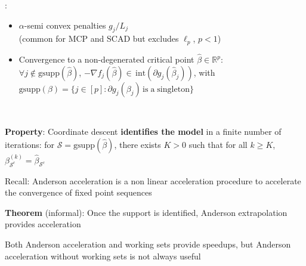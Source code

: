 \documentclass[english,final,t]{beamer}
\newcommand{\bbR}{\mathbb{R}}
\newcommand{\cS}{\mathcal{S}}
\begin{document}
\begin{frame}{}
\begin{columns}[t]
\begin{column}{.3\linewidth}
\begin{block}{\textbf{\color{malgared}{\# 2 Support Identification}}}
		{\color{malgared}{Assumptions}}:
		\begin{itemize}
			\item
			$\alpha$-semi convex penalties $g_j / L_j$
			\\
			(common for MCP and SCAD but excludes $\ell_p$, $p<1$)
			\item
			Convergence to a non-degenerated critical point $\hat \beta \in \bbR^p$:\\
			 $\forall j \notin \mathrm{gsupp}(\hat \beta)$,
			$- \nabla f_j (\hat \beta) \in \, \mathrm{int}(\partial g_j(\hat \beta_j))$, with
			$\mathrm{gsupp}(\beta) = \{j \in [p]: \partial g_j(\beta_j) \, \mathrm{is \; a \; singleton}\}$
		\end{itemize}

		 \vspace{0.5em}

		\textbf{\color{malgared}Property}:  Coordinate descent \textbf{identifies the model} in a finite number of iterations: for $\cS = \mathrm{gsupp}(\hat \beta)$, there exists $K>0$ such that for all $k\geq K$, $\beta_{\cS^c}^{(k)} = \hat \beta_{\cS^c}$
		\end{block}
	\begin{block}{\textbf{\color{malgared}{\# 3 Anderson Acceleration}}}

		{\color{malgared}Recall}: Anderson acceleration is a non linear acceleration procedure to accelerate the convergence of fixed point sequences

		\textbf{\color{malgared}Theorem} (informal): Once the support is identified, Anderson extrapolation provides acceleration

		\begin{center}
		\end{center}

		Both Anderson acceleration and working sets provide speedups, but
		Anderson acceleration without working sets is not always useful


\end{block}
\end{column}
\end{columns}
\end{frame}
\end{document}
